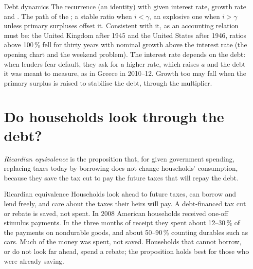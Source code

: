 \begin{model}{Debt dynamics}
\assumes The recurrence (an identity) with given interest rate, growth rate and .
\predicts The path of the ; a stable ratio when $i < \gamma$, an explosive one when $i > \gamma$ unless primary surpluses offset it.
\tested Consistent with it, as an accounting relation must be: the United Kingdom after 1945 and the United States after 1946, ratios above 100\,\% fell for thirty years with nominal growth above the interest rate (the opening chart
  and the weekend problem).
\breaks The interest rate depends on the debt: when lenders fear default, they ask for a higher rate, which raises $a$ and the debt it was meant to measure, as in Greece in
  2010--12. Growth too may fall when the primary surplus is raised to stabilise the debt, through the multiplier.
\end{model}

\section{Do households look through the debt?}\label{sec:g12:fiscal-policy-and-debt:ricardian}

\begin{definition}\label{def:g12:fiscal-policy-and-debt:ricardian-equivalence}
\emph{Ricardian equivalence} is the proposition that, for given government spending, replacing taxes today by borrowing does not change
households' consumption, because they save the tax cut to pay the future taxes that will repay the debt.
\end{definition}

\begin{model}{Ricardian equivalence}
\assumes Households look ahead to future taxes, can borrow and lend freely, and care about the taxes their heirs will pay.
\predicts A debt-financed tax cut or rebate is saved, not spent.
\tested In 2008 American households received one-off stimulus payments. In the three months of receipt they spent about 12--30\,\% of the payments on nondurable goods, and about 50--90\,\% counting durables such as cars. Much of the money was spent, not saved.
\breaks Households that cannot borrow, or do not look far ahead, spend a rebate; the proposition holds best for those who were already saving.
\end{model}

